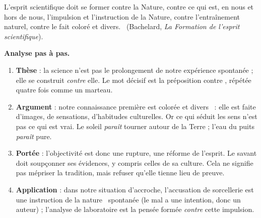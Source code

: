 \documentclass[11pt]{article}
\begin{document}
\begin{experience}
\guillemotleft L'esprit scientifique doit se former contre la Nature, contre ce qui est, en nous et hors de nous, l'impulsion et l'instruction de la Nature, contre l'entraînement naturel, contre le fait coloré et divers. \guillemotright\ (Bachelard, \emph{La Formation de l'esprit scientifique}).

\textbf{Analyse pas à pas.}
\begin{enumerate}
\item \textbf{Thèse} : la science n'est pas le prolongement de notre expérience spontanée ; elle se construit \emph{contre} elle. Le mot décisif est la préposition \guillemotleft contre \guillemotright, répétée quatre fois comme un marteau.
\item \textbf{Argument} : notre connaissance première est \guillemotleft colorée et divers \guillemotright\ : elle est faite d'images, de sensations, d'habitudes culturelles. Or ce qui séduit les sens n'est pas ce qui est vrai. Le soleil \emph{paraît} tourner autour de la Terre ; l'eau du puits \emph{paraît} pure.
\item \textbf{Portée} : l'objectivité est donc une rupture, une réforme de l'esprit. Le savant doit soupçonner ses évidences, y compris celles de sa culture. Cela ne signifie pas mépriser la tradition, mais refuser qu'elle tienne lieu de preuve.
\item \textbf{Application} : dans notre situation d'accroche, l'accusation de sorcellerie est une \guillemotleft instruction de la nature \guillemotright\ spontanée (le mal a une intention, donc un auteur) ; l'analyse de laboratoire est la pensée formée \emph{contre} cette impulsion.
\end{enumerate}
\end{experience}
\end{document}
